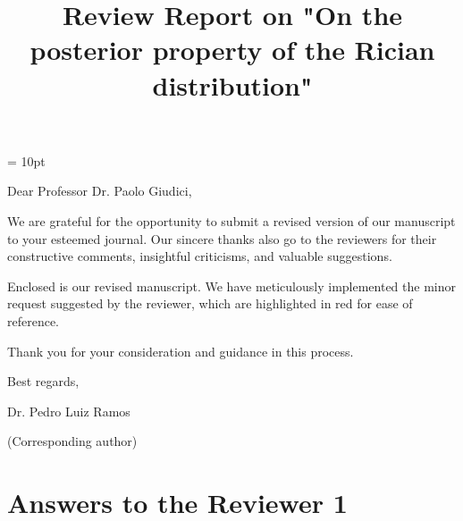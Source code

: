 \documentclass[12pt]{article}
\makeatletter
\newcommand{\singlespacing}{\let\CS=\@currsize\renewcommand{\baselinestretch}{1}\tiny\CS}
\makeatother
\begin{document}
\baselineskip=24pt
\parskip = 10pt
\def \qed {\hfill \vrule height7pt width 5pt depth 0pt}
\setlength\parindent{0pt}
\def\refhg{\hangindent=20pt\hangafter=1}
\def\refmark{\par\vskip 2.50mm\noindent\refhg}
%
%
%
%
%

\def\mathrlap{\mathpalette\mathrlapinternal} 
\def\mathclap{\mathpalette\mathclapinternal}
\def\mathllapinternal#1#2{\llap{$\mathsurround=0pt#1{#2}$}}
\def\mathrlapinternal#1#2{\rlap{$\mathsurround=0pt#1{#2}$}}
\newtheorem{theorem}{Theorem}
\newenvironment{proof}[1][Proof]{\noindent\textbf{#1.} }{\ \rule{0.5em}{0.5em}}


\title{Review Report on
"On the posterior property of the Rician distribution"}
\maketitle

Dear Professor Dr. Paolo Giudici,

We are grateful for the opportunity to submit a revised version of our manuscript to your esteemed journal. Our sincere thanks also go to the reviewers for their constructive comments, insightful criticisms, and valuable suggestions.

Enclosed is our revised manuscript. We have meticulously implemented the minor request suggested by the reviewer, which are highlighted in red for ease of reference.

Thank you for your consideration and guidance in this process.

Best regards,

Dr. Pedro Luiz Ramos

\vspace{-0.3cm}(Corresponding author)

\newpage

\section*{Answers to the Reviewer 1}
\end{document}
